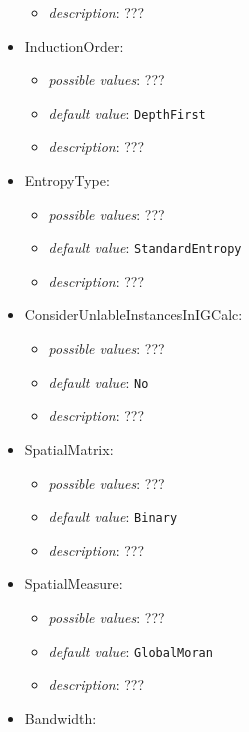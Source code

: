 \documentclass{article}
\begin{document}
\begin{itemize}
\begin{itemize}
                \item \emph{description}: ???
           \end{itemize}
    \item InductionOrder:
           \begin{itemize}
                \item \emph{possible values}: ???
                \item \emph{default value}: \texttt{DepthFirst}
                \item \emph{description}: ???
           \end{itemize}
    \item EntropyType:
           \begin{itemize}
                \item \emph{possible values}: ???
                \item \emph{default value}: \texttt{StandardEntropy}
                \item \emph{description}: ???
           \end{itemize}
    \item ConsiderUnlableInstancesInIGCalc:
           \begin{itemize}
                \item \emph{possible values}: ???
                \item \emph{default value}: \texttt{No}
                \item \emph{description}: ???
           \end{itemize}
    \item SpatialMatrix:
           \begin{itemize}
                \item \emph{possible values}: ???
                \item \emph{default value}: \texttt{Binary}
                \item \emph{description}: ???
           \end{itemize}
    \item SpatialMeasure:
           \begin{itemize}
                \item \emph{possible values}: ???
                \item \emph{default value}: \texttt{GlobalMoran}
                \item \emph{description}: ???
           \end{itemize}
    \item Bandwidth:

\end{itemize}
\end{document}

